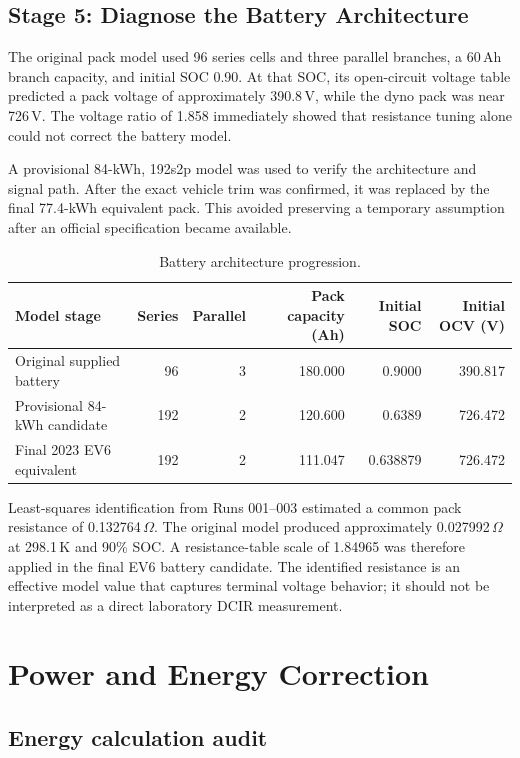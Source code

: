 \documentclass[11pt,letterpaper]{article}
\newcommand{\SI}[2]{#1\,#2}
\newcommand{\ohm}{\ensuremath{\Omega}}
\begin{document}
\subsection{Stage 5: Diagnose the Battery Architecture}

The original pack model used 96 series cells and three parallel branches, a
\SI{60}{Ah} branch capacity, and initial SOC 0.90. At that SOC, its open-circuit
voltage table predicted a pack voltage of approximately \SI{390.8}{V}, while
the dyno pack was near \SI{726}{V}. The voltage ratio of 1.858 immediately
showed that resistance tuning alone could not correct the battery model.

A provisional 84-kWh, 192s2p model was used to verify the architecture and
signal path. After the exact vehicle trim was confirmed, it was replaced by the
final 77.4-kWh equivalent pack. This avoided preserving a temporary assumption
after an official specification became available.

\begin{table}[H]
\centering
\caption{Battery architecture progression.}
\begin{tabularx}{\textwidth}{Yrrrrr}
\toprule
Model stage & Series & Parallel & Pack capacity (Ah) & Initial SOC & Initial OCV (V) \\
\midrule
Original supplied battery & 96 & 3 & 180.000 & 0.9000 & 390.817 \\
Provisional 84-kWh candidate & 192 & 2 & 120.600 & 0.6389 & 726.472 \\
Final 2023 EV6 equivalent & 192 & 2 & 111.047 & 0.638879 & 726.472 \\
\bottomrule
\end{tabularx}
\end{table}

Least-squares identification from Runs 001--003 estimated a common pack
resistance of \SI{0.132764}{\ohm}. The original model produced approximately
\SI{0.027992}{\ohm} at \SI{298.1}{K} and 90\% SOC. A resistance-table scale of
1.84965 was therefore applied in the final EV6 battery candidate. The
identified resistance is an effective model value that captures terminal
voltage behavior; it should not be interpreted as a direct laboratory DCIR
measurement.

\section{Power and Energy Correction}

\subsection{Energy calculation audit}
\end{document}
